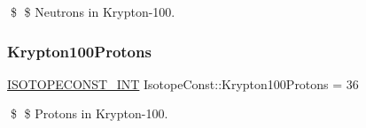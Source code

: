 \$ \$ Neutrons in Krypton-\/100. \mbox{\label{group___isotope_const-_krypton-_kr100_gac5066b0d0bdcce0084002496ec235fbe}} 
\subsubsection{\texorpdfstring{Krypton100\+Protons}{Krypton100Protons}}
{\footnotesize\ttfamily \mbox{\hyperlink{group___isotope_const-_macros_ga5f18360b3e99483a35c32d789e62621c}{I\+S\+O\+T\+O\+P\+E\+C\+O\+N\+S\+T\+\_\+\+I\+NT}} Isotope\+Const\+::\+Krypton100\+Protons = 36}

\$ \$ Protons in Krypton-\/100. 